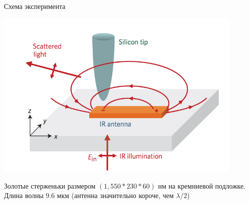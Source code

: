 \documentclass[9pt, compress, xcolor=table]{beamer}
\begin{document}
\begin{frame}{Схема эксперимента}

\begin{center}
\includegraphics[width=0.9\textwidth]{optant72}
\end{center}

Золотые стерженьки размером $(1,550*230*60)$ нм на кремниевой подложке. Длина волны $9.6$ мкм (антенна значительно короче, чем $\lambda/2$) 

\end{frame}
\end{document}
